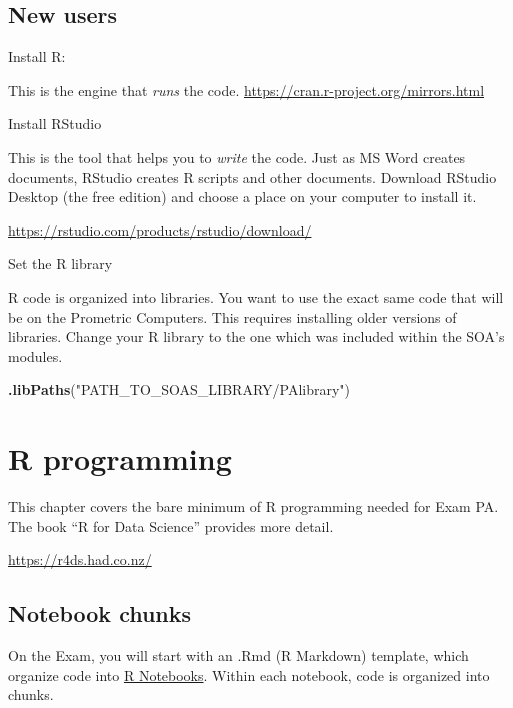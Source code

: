 \documentclass[
  openany]{book}
\newenvironment{Shaded}{\begin{snugshade}}{\end{snugshade}}
\newcommand{\KeywordTok}[1]{\textcolor[rgb]{0.13,0.29,0.53}{\textbf{#1}}}
\newcommand{\NormalTok}[1]{#1}
\newcommand{\StringTok}[1]{\textcolor[rgb]{0.31,0.60,0.02}{#1}}
\begin{document}
\hypertarget{new-users}{%
\section{New users}\label{new-users}}

Install R:

This is the engine that \emph{runs} the code. \url{https://cran.r-project.org/mirrors.html}

Install RStudio

This is the tool that helps you to \emph{write} the code. Just as MS Word creates documents, RStudio creates R scripts and other documents. Download RStudio Desktop (the free edition) and choose a place on your computer to install it.

\url{https://rstudio.com/products/rstudio/download/}

Set the R library

R code is organized into libraries. You want to use the exact same code that will be on the Prometric Computers. This requires installing older versions of libraries. Change your R library to the one which was included within the SOA's modules.

\begin{Shaded}
\begin{Highlighting}[]
\KeywordTok{.libPaths}\NormalTok{(}\StringTok{"PATH_TO_SOAS_LIBRARY/PAlibrary"}\NormalTok{)}
\end{Highlighting}
\end{Shaded}

\hypertarget{r-programming}{%
\chapter{R programming}\label{r-programming}}

This chapter covers the bare minimum of R programming needed for Exam PA. The book
``R for Data Science'' provides more detail.

\url{https://r4ds.had.co.nz/}

\hypertarget{notebook-chunks}{%
\section{Notebook chunks}\label{notebook-chunks}}

On the Exam, you will start with an .Rmd (R Markdown) template, which organize
code into \href{https://bookdown.org/yihui/rmarkdown/notebook.html}{R Notebooks}.
Within each notebook, code is organized into chunks.
\end{document}
